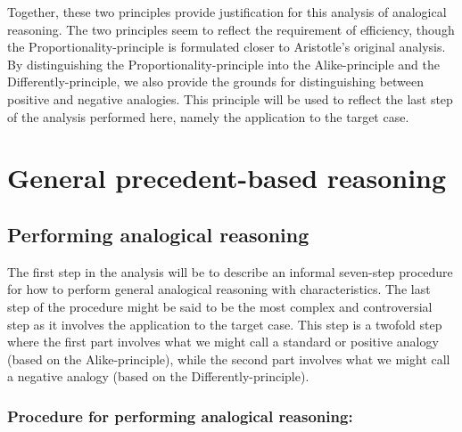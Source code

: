 	Together, these two principles provide justification for this analysis of analogical reasoning. The two principles seem to reflect the requirement of efficiency, though the Proportionality-principle is formulated closer to Aristotle's original analysis. By distinguishing the Proportionality-principle into the Alike-principle and the Differently-principle, we also provide the grounds for distinguishing between positive and negative analogies. This principle will be used to reflect the last step of the analysis performed here, namely the application to the target case.

\section{General precedent-based reasoning}\label{sec:general-precedent-based-reasoning}

	\subsection{Performing analogical reasoning}

	The first step in the analysis will be to describe an informal seven-step procedure for how to perform general analogical reasoning with characteristics. The last step of the procedure might be said to be the most complex and controversial step as it involves the application to the target case. This step is a twofold step where the first part involves what we might call a standard or positive analogy (based on the Alike-principle), while the second part involves what we might call a negative analogy (based on the Differently-principle). 
		
		\subsubsection{Procedure for performing analogical reasoning:}
		
